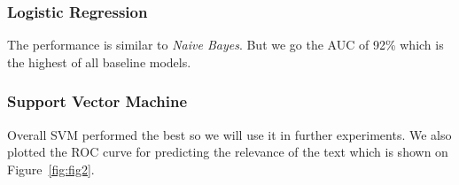 \documentclass[11pt,a4paper]{article}
\begin{document}
\subsubsection{Logistic Regression}


The performance is similar to \textit{Naive Bayes}.
But we go the AUC of 92\% which is the highest of all baseline models.

\subsubsection{Support Vector Machine}


Overall SVM performed the best so we will use it in further experiments.
We also plotted the ROC curve for predicting the relevance of the text which is shown on Figure~\ref{fig:fig2}.
\end{document}
